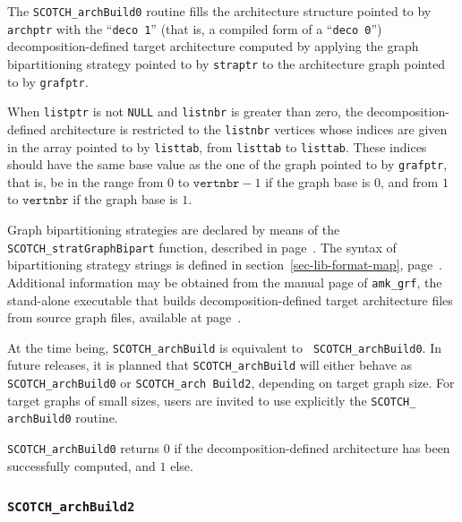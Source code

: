 \begin{itemize}
\progdes

The {\tt SCOTCH\_archBuild0} routine fills the architecture structure
pointed to by {\tt archptr} with the ``\texttt{deco 1}'' (that is, a
compiled form of a ``\texttt{deco 0}'') decomposition-defined target
architecture computed by applying the graph bipartitioning strategy
pointed to by {\tt straptr} to the architecture graph pointed to by
{\tt grafptr}.

When {\tt listptr} is not {\tt NULL} and {\tt listnbr} is greater than
zero, the decomposition-defined architecture is restricted to the
{\tt listnbr} vertices whose indices are given in the array pointed to
by {\tt listtab}, from {\tt listtab\lbt [0]} to {\tt listtab\lbt
[listnbr - 1]}. These indices should have the same base value as the
one of the graph pointed to by {\tt grafptr}, that is, be in the
range from $0$ to $\mathtt{vertnbr} - 1$ if the graph base is
$0$, and from $1$ to $\mathtt{vertnbr}$ if the graph base is $1$.

Graph bipartitioning strategies are declared by means of the
{\tt SCOTCH\_\lbt strat\lbt Graph\lbt Bipart} function, described in
page~\pageref{sec-lib-strat-graph-bipart}. The syntax of bipartitioning
strategy strings is defined in section~\ref{sec-lib-format-map},
page~\pageref{sec-lib-format-bipart}.
Additional information may be obtained from the manual page of
{\tt amk\_\lbt grf}, the stand-alone executable that builds
decomposition-defined target architecture files from source graph
files, available at page~\pageref{sec-prog-amkgrf}.

At the time being, {\tt SCOTCH\_arch\lbt Build} is equivalent to {\tt
SCOTCH\_\lbt arch\lbt Build0}. In future releases, it is planned that
{\tt SCOTCH\_\lbt arch\lbt Build} will either behave as
{\tt SCOTCH\_\lbt arch\lbt Build0} or {\tt SCOTCH\_\lbt arch\lbt
Build2}, depending on target graph size. For target graphs of small
sizes, users are invited to use explicitly the {\tt SCOTCH\_\lbt
arch\lbt Build0} routine.

\progret

{\tt SCOTCH\_archBuild0} returns $0$ if the decomposition-defined
architecture has been successfully computed, and $1$ else.
\end{itemize}

\subsubsection{{\tt SCOTCH\_archBuild2}}
\label{sec-lib-arch-build-two}

